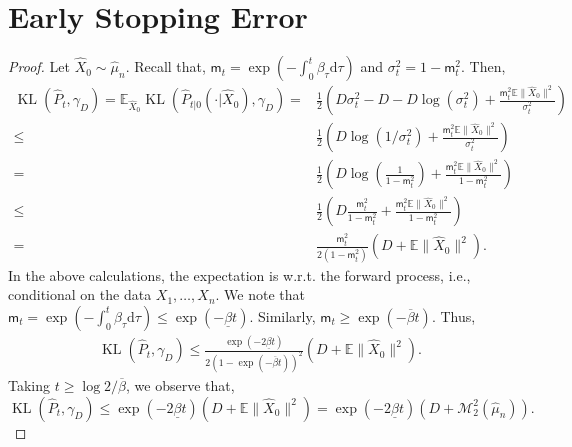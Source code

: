 \documentclass[12pts]{article}
\newcommand{\diff}{\mathrm{d}}
\newcommand{\sM}{ \mathscr{M}}
\newcommand{\hP}{ \hat{P}}
\newcommand{\hX}{ \widehat{X}}
\newcommand{\hmu}{\hat{\mu}}
\newcommand{\E}{\mathbb{E}}
\newcommand{\kl}{\operatorname{KL}}
\begin{document}
 \section{Early Stopping Error}\label{app_e}
 \klbd*
 \begin{proof}
Let $\hX_0 \sim \hmu_n$. Recall that, $\mathsf{m}_t = \exp\left(-\int_0^t \beta_\tau \diff  \tau\right)$ and $\sigma^2_t = 1-\mathsf{m}_t^2$. Then,
\begingroup
\allowdisplaybreaks
    \begin{align*}
        \kl(\hP_t , \gamma_D) =  \E_{\hX_0} \kl(\hP_{t|0}(\cdot | \hX_0), \gamma_D) 
        = & \frac{1}{2} \left(D \sigma_t^2 - D - D\log(\sigma_t^2)  + \frac{\mathsf{m}_t^2\E\|\hX_0\|^2}{\sigma_t^2}\right)\\
        \le & \frac{1}{2} \left( D\log(1/\sigma_t^2)  + \frac{\mathsf{m}_t^2\E\|\hX_0\|^2}{\sigma_t^2}\right)\\
        = & \frac{1}{2} \left( D\log\left(\frac{1}{1-\mathsf{m}_t^2}\right)  + \frac{\mathsf{m}_t^2\E\|\hX_0\|^2}{1-\mathsf{m}_t^2}\right)\\
        \le & \frac{1}{2} \left( D\frac{\mathsf{m}_t^2}{1-\mathsf{m}_t^2}  + \frac{\mathsf{m}_t^2\E\|\hX_0\|^2}{1-\mathsf{m}_t^2}\right)\\
        = & \frac{\mathsf{m}_t^2}{2(1-\mathsf{m}_t^2)} (D + \E \|\hX_0\|^2).
    \end{align*}
    \endgroup
    In the above calculations, the expectation is w.r.t. the forward process, i.e., conditional on the data $X_1, \dots, X_n$. We note that $\mathsf{m}_t = \exp\left(-\int_0^t \beta_\tau \diff  \tau\right) \le \exp\left(-\underline{\beta}t\right)$. Similarly, $\mathsf{m}_t \ge \exp\left(-\overline{\beta} t\right)$. Thus,
  \begin{align*}
      \kl(\hP_t , \gamma_D) \le \frac{\exp\left(-2\underline{\beta}t\right)}{2(1-\exp\left(-\overline{\beta}t\right))^2} (D + \E \|\hX_0\|^2).
  \end{align*}
  Taking $t \ge \log 2/\overline{\beta}$, we observe that, \[\kl(\hP_t , \gamma_D) \le \exp\left(-2\underline{\beta}t\right) (D + \E \|\hX_0\|^2) = \exp\left(-2\underline{\beta}t\right) (D + \sM_2^2(\hmu_n)).\]
\end{proof}
\end{document}
